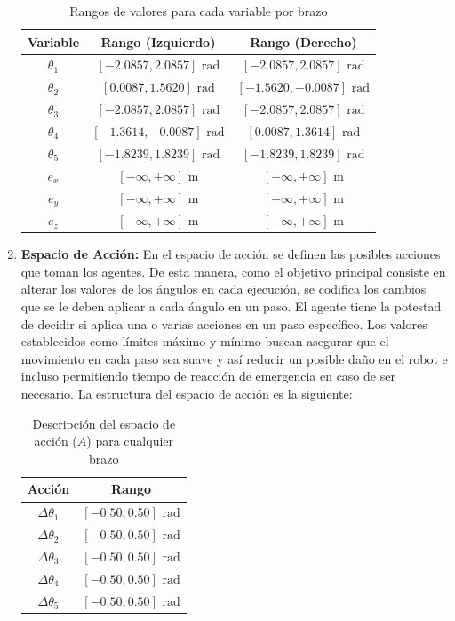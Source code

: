 \begin{enumerate}
	\begin{table}[h!]
		\centering
		\caption{Rangos de valores para cada variable por brazo}
		\begin{tabular}{|c|c|c|}
			\hline
			\textbf{Variable} & \textbf{Rango (Izquierdo)} & \textbf{Rango (Derecho)} \\
			\hline
			$\theta_1$ & $[-2.0857, 2.0857] \text{ rad}$ & $[-2.0857, 2.0857] \text{ rad}$ \\
			\hline
			$\theta_2$ & $[0.0087, 1.5620] \text{ rad}$ & $[-1.5620, -0.0087] \text{ rad}$ \\
			\hline
			$\theta_3$ & $[-2.0857, 2.0857] \text{ rad}$ & $[-2.0857, 2.0857] \text{ rad}$ \\
			\hline
			$\theta_4$ & $[-1.3614, -0.0087] \text{ rad}$ & $[0.0087, 1.3614] \text{ rad}$ \\
			\hline
			$\theta_5$ & $[-1.8239, 1.8239] \text{ rad}$ & $[-1.8239, 1.8239] \text{ rad}$ \\
			\hline
			$e_x$ & $[-\infty, +\infty] \text{ m}$ & $[-\infty, +\infty] \text{ m}$ \\
			\hline
			$e_y$ & $[-\infty, +\infty] \text{ m}$ & $[-\infty, +\infty] \text{ m}$ \\
			\hline
			$e_z$ & $[-\infty, +\infty] \text{ m}$ & $[-\infty, +\infty] \text{ m}$ \\
			\hline
		\end{tabular}
		\label{tab:obs_rangos}
	\end{table}
	
	
	\item \textbf{Espacio de Acción: } En el espacio de acción se definen las posibles acciones que toman los agentes. De esta manera, como el objetivo principal consiste en alterar los valores de los ángulos en cada ejecución, se codifica los cambios que se le deben aplicar a cada ángulo en un paso. El agente tiene la potestad de decidir si aplica una o varias acciones en un paso específico. Los valores establecidos como límites máximo y mínimo buscan asegurar que el movimiento en cada paso sea suave y así reducir un posible daño en el robot e incluso permitiendo tiempo de reacción de emergencia en caso de ser necesario. La estructura del espacio de acción es la siguiente:
	
	\begin{table}[h!]
		\centering
		\caption{Descripción del espacio de acción ($A$) para cualquier brazo}
		\begin{tabular}{|c|c|}
			\hline
			\textbf{Acción} & \textbf{Rango} \\
			\hline
			$\Delta\theta_1$ & $[-0.50, 0.50] \text{ rad}$ \\
			\hline
			$\Delta\theta_2$ & $[-0.50, 0.50] \text{ rad}$ \\
			\hline
			$\Delta\theta_3$ & $[-0.50, 0.50] \text{ rad}$ \\
			\hline
			$\Delta\theta_4$ & $[-0.50, 0.50] \text{ rad}$ \\
			\hline
			$\Delta\theta_5$ & $[-0.50, 0.50] \text{ rad}$ \\
			\hline
		\end{tabular}
		\label{tab:accion_space}
	\end{table}
	

\end{enumerate}
